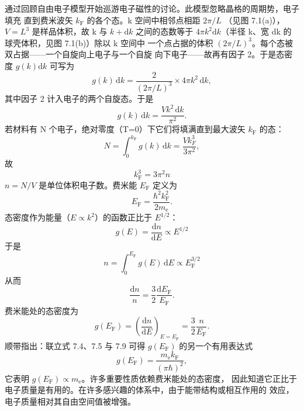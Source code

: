 通过回顾自由电子模型开始巡游电子磁性的讨论。此模型忽略晶格的周期势，电子填充
直到费米波矢 $k_{\mathrm{F}}$ 的各个态。k 空间中相邻点相距 $2\pi/L$
（见图 7.1(a)），$V=L^{3}$ 是样品体积，故 k 与 $k+\mathrm{d}k$ 之间的态数等于
$4\pi k^{2}\mathrm{d}k$（半径 k、宽 dk 的球壳体积，见图 7.1(b)）除以 k 空间中
一个点占据的体积 $(2\pi/L)^{3}$。每个态被双占据——一个自旋向上电子与一个自旋
向下电子——故再有因子 2。于是态密度 $g(k)\mathrm{d}k$ 可写为
\begin{equation*}
g(k)\,\mathrm{d}k = \frac{2}{(2\pi/L)^{3}}\times4\pi k^{2}\,\mathrm{d}k,\tag{7.1}
\end{equation*}
其中因子 2 计入电子的两个自旋态。于是
\begin{equation*}
g(k)\,\mathrm{d}k = \frac{Vk^{2}\,\mathrm{d}k}{\pi^{2}}.\tag{7.2}
\end{equation*}
若材料有 N 个电子，绝对零度（T=0）下它们将填满直到最大波矢 $k_{\mathrm{F}}$ 的态：
\begin{equation*}
N = \int_{0}^{k_{\mathrm{F}}}g(k)\,\mathrm{d}k = \frac{Vk_{F}^{3}}{3\pi^{2}},\tag{7.3}
\end{equation*}
故
\begin{equation*}
k_{\mathrm{F}}^{3} = 3\pi^{2}n\tag{7.4}
\end{equation*}
$n=N/V$ 是单位体积电子数。费米能 $E_{\mathrm{F}}$ 定义为
\begin{equation*}
E_{\mathrm{F}} = \frac{\hbar^{2}k_{\mathrm{F}}^{2}}{2m_{\mathrm{e}}}.\tag{7.5}
\end{equation*}
态密度作为能量（$E\propto k^{2}$）的函数正比于 $E^{1/2}$：
\begin{equation*}
g(E) = \frac{\mathrm{d}n}{\mathrm{d}E} \propto E^{1/2}\tag{7.6}
\end{equation*}
于是
\begin{equation*}
n = \int_{0}^{E_{\mathrm{F}}}g(E)\,\mathrm{d}E \propto E_{\mathrm{F}}^{3/2}\tag{7.7}
\end{equation*}
从而
\begin{equation*}
\frac{\mathrm{d}n}{n} = \frac{3}{2}\frac{\mathrm{d}E_{\mathrm{F}}}{E_{\mathrm{F}}}.\tag{7.8}
\end{equation*}
费米能处的态密度为
\begin{equation*}
g(E_{\mathrm{F}}) = \left(\frac{\mathrm{d}n}{\mathrm{d}E}\right)_{E=E_{\mathrm{F}}} = \frac{3}{2}\frac{n}{E_{\mathrm{F}}}.\tag{7.9}
\end{equation*}
顺带指出：联立式 7.4、7.5 与 7.9 可得 $g(E_{\mathrm{F}})$ 的另一个有用表达式
\begin{equation*}
g(E_{\mathrm{F}}) = \frac{m_{\mathrm{e}}k_{\mathrm{F}}}{(\pi\hbar)^{2}},\tag{7.10}
\end{equation*}
它表明 $g(E_{\mathrm{F}})\propto m_{\mathrm{e}}$。许多重要性质依赖费米能处的态密度，
因此知道它正比于电子质量是有用的。在许多感兴趣的体系中，由于能带结构或相互作用的
效应，电子质量相对其自由空间值被增强。

